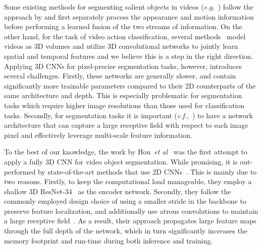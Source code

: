 \documentclass{bmvc2k}
\makeatletter
\newcommand*{\eg}{\emph{e.g.}\@\xspace}
\newcommand*{\cf}{\emph{c.f.}\@\xspace}
\newcommand*{\etal}{\emph{et al.}\@\xspace}
\def\eg{\emph{e.g}\bmvaOneDot}
\def\etal{\emph{et al}\bmvaOneDot}
\makeatother
\begin{document}
Some existing methods for segmenting salient objects in videos (\eg,~\cite{Jain17CVPR, Tokmakov17ICCV}) follow the approach by \cite{simonyan14nips} and first separately process the appearance and motion information before performing a learned fusion of the two streams of information.
On the other hand, for the task of video action classification, several methods~\cite{Hara18CVPR, Tran18CVPR, Tran19ICCV, Ghadiyaram19CVPR} model videos as 3D volumes and utilize 3D convolutional networks to jointly learn spatial and temporal features and we believe this is a step in the right direction. 
Applying 3D CNNs for pixel-precise segmentation tasks, however, introduces several challenges. Firstly, these networks are generally slower, and contain significantly more trainable parameters compared to their 2D counterparts of the same architecture and depth.
This is especially problematic for segmentation tasks which require higher image resolutions than those used for classification tasks. Secondly, for segmentation tasks it is important (\cf,~\cite{Chen17ARXIV}) to have a network architecture that can capture a large receptive field with respect to each image pixel and effectively leverage multi-scale feature information.

To the best of our knowledge, the work by Hou~\etal~\cite{Hou19BMVC} was the first attempt to apply a fully 3D CNN for video object segmentation.
While promising, it is out-performed by state-of-the-art methods that use 2D CNNs~\cite{Wang19ICCV, Yang19ICCVAnchorDiff}.
This is mainly due to two reasons. Firstly, to keep the computational load manageable, they employ a shallow 3D ResNet-34~\cite{Tran18CVPR} as the encoder network. 
Secondly, they follow the commonly employed design choice of using a smaller stride in the backbone to preserve feature localization, and additionally use atrous convolutions to maintain a large receptive field~\cite{Chen17ARXIV,Chen2018ECCV}. As a result, their approach propagates large feature maps through the full depth of the network, which in turn significantly increases the memory footprint and run-time during both inference and training. 
\end{document}
